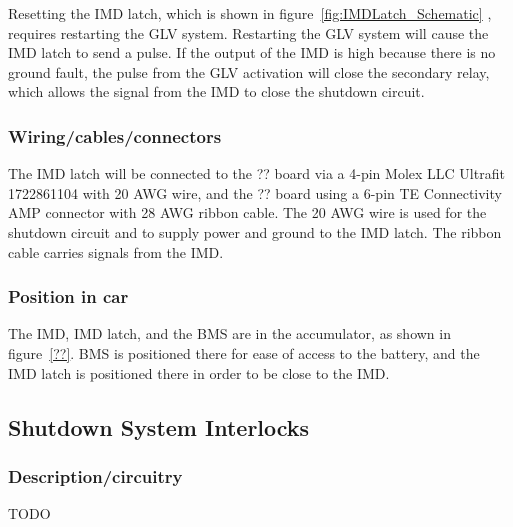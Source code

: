 \documentclass{article}
\begin{document}
Resetting the IMD latch, which is shown in figure~\ref{fig:IMDLatch_Schematic} , requires restarting the GLV system. Restarting the GLV system will cause the IMD latch to send a pulse. If the output of the IMD is high because there is no ground fault, the pulse from the GLV activation will close the secondary relay, which allows the signal from the IMD to close the shutdown circuit.



\subsubsection{Wiring/cables/connectors}

The IMD latch will be connected to the ?? board via a 4-pin Molex LLC Ultrafit 1722861104 with 20 AWG wire, and the ?? board using a  6-pin TE Connectivity AMP connector with 28 AWG ribbon cable. The 20 AWG wire is used for the shutdown circuit and to supply power and ground to the IMD latch. The ribbon cable carries signals from the IMD.%



\subsubsection{Position in car}
The IMD, IMD latch, and the BMS are in the accumulator, as shown in figure~\ref{??}. BMS is positioned there for ease of access to the battery, and the IMD latch is positioned there in order to be close to the IMD.









\subsection{Shutdown System Interlocks}
\subsubsection{Description/circuitry}
TODO
\end{document}
